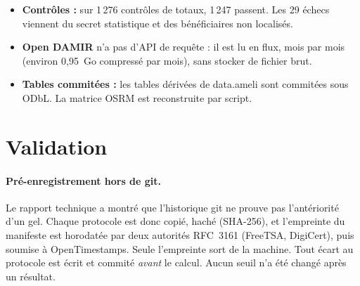 \documentclass[11pt]{article}
\begin{document}
\begin{itemize}
  \item \textbf{Contrôles :} sur 1\,276 contrôles de totaux, 1\,247 passent\mesure{}. Les 29 échecs viennent du
        secret statistique et des bénéficiaires non localisés.
  \item \textbf{Open DAMIR} n'a pas d'API de requête : il est lu en flux, mois par mois (environ 0,95~Go compressé
        par mois\mesure{}), sans stocker de fichier brut.
  \item \textbf{Tables commitées :} les tables dérivées de data.ameli sont commitées sous ODbL. La matrice OSRM est
        reconstruite par script.
\end{itemize}

\section{Validation}\label{sec:validation}
\paragraph{Pré-enregistrement hors de git.} Le rapport technique a montré que l'historique git ne prouve pas
l'antériorité d'un gel. Chaque protocole est donc copié, haché (SHA-256), et l'empreinte du manifeste est horodatée
par deux autorités RFC~3161 (FreeTSA, DigiCert), puis soumise à OpenTimestamps. Seule l'empreinte sort de la machine.
Tout écart au protocole est écrit et commité \emph{avant} le calcul. Aucun seuil n'a été changé après un résultat.
\end{document}
